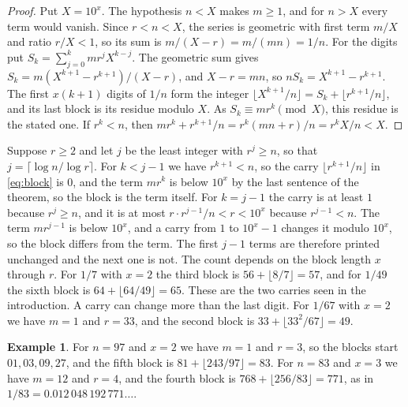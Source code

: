 \documentclass[11pt,a4paper]{amsart}
\theoremstyle{definition}
\newtheorem{example}{Example}
\theoremstyle{remark}
\begin{document}
\begin{proof}
Put $X = 10^x$. The hypothesis $n < X$ makes $m \ge 1$, and for $n > X$ every term would vanish. Since $r < n < X$, the series is geometric with first term $m/X$ and ratio $r/X < 1$, so its sum is $m/(X - r) = m/(mn) = 1/n$.
For the digits put $S_k = \sum_{j=0}^{k} m r^j X^{k-j}$. The geometric sum
gives $S_k = m(X^{k+1} - r^{k+1})/(X - r)$, and $X - r = mn$, so
$n S_k = X^{k+1} - r^{k+1}$. The first $x(k+1)$ digits of $1/n$ form the integer
$\lfloor X^{k+1}/n \rfloor = S_k + \lfloor r^{k+1}/n \rfloor$, and its last
block is its residue modulo $X$. As $S_k \equiv m r^k \pmod X$, this residue is
the stated one. If $r^k < n$, then
$m r^k + r^{k+1}/n = r^k (mn + r)/n = r^k X/n < X$.
\end{proof}

Suppose $r \ge 2$ and let $j$ be the least integer with $r^j \ge n$, so that $j = \lceil \log n/\log r \rceil$. For $k < j - 1$ we have $r^{k+1} < n$, so the carry $\lfloor r^{k+1}/n \rfloor$ in \eqref{eq:block} is $0$, and the term $m r^k$ is below $10^x$ by the last sentence of the theorem, so the block is the term itself. For $k = j - 1$ the carry is at least $1$ because $r^j \ge n$, and it is at most $r\cdot r^{j-1}/n < r < 10^x$ because $r^{j-1} < n$. The term $m r^{j-1}$ is below $10^x$, and a carry from $1$ to $10^x - 1$ changes it modulo $10^x$, so the block differs from the term. The first $j - 1$ terms are therefore printed unchanged and the next one is not. The count depends on the block length $x$ through $r$. For
$1/7$ with $x = 2$ the third block is $56 + \lfloor 8/7 \rfloor = 57$, and for
$1/49$ the sixth block is $64 + \lfloor 64/49 \rfloor = 65$. These are the two
carries seen in the introduction. A carry can change more than the last digit.
For $1/67$ with $x = 2$ we have $m = 1$ and $r = 33$, and the second block is
$33 + \lfloor 33^2/67 \rfloor = 49$.

\begin{example}
For $n = 97$ and $x = 2$ we have $m = 1$ and $r = 3$, so the blocks start
$01, 03, 09, 27$, and the fifth block is $81 + \lfloor 243/97 \rfloor = 83$. For
$n = 83$ and $x = 3$ we have $m = 12$ and $r = 4$, and the fourth block is
$768 + \lfloor 256/83 \rfloor = 771$, as in $1/83 = 0.012\,048\,192\,771\dots$.
\end{example}
\end{document}
